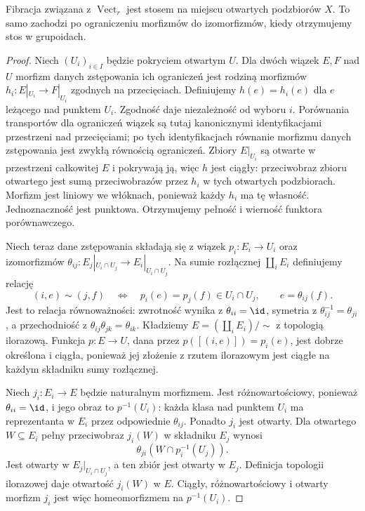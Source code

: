 \begin{twierdzenie}\label{cat:thm:vector-bundle-stack}
Fibracja związana z $\operatorname{Vect}_r$ jest stosem na miejscu otwartych podzbiorów $X$. To samo zachodzi po ograniczeniu morfizmów do izomorfizmów, kiedy otrzymujemy stos w grupoidach.
\end{twierdzenie}
\begin{proof}
Niech $(U_i)_{i\in I}$ będzie pokryciem otwartym $U$. Dla dwóch wiązek $E,F$ nad $U$ morfizm danych zstępowania ich ograniczeń jest rodziną morfizmów $h_i:E|_{U_i}\to F|_{U_i}$ zgodnych na przecięciach. Definiujemy $h(e)=h_i(e)$ dla $e$ leżącego nad punktem $U_i$. Zgodność daje niezależność od wyboru $i$. Porównania transportów dla ograniczeń wiązek są tutaj kanonicznymi identyfikacjami przestrzeni nad przecięciami; po tych identyfikacjach równanie morfizmu danych zstępowania jest zwykłą równością ograniczeń. Zbiory $E|_{U_i}$ są otwarte w przestrzeni całkowitej $E$ i pokrywają ją, więc $h$ jest ciągły: przeciwobraz zbioru otwartego jest sumą przeciwobrazów przez $h_i$ w tych otwartych podzbiorach. Morfizm jest liniowy we włóknach, ponieważ każdy $h_i$ ma tę własność. Jednoznaczność jest punktowa. Otrzymujemy pełność i wierność funktora porównawczego.

Niech teraz dane zstępowania składają się z wiązek $p_i:E_i\to U_i$ oraz izomorfizmów $\theta_{ij}:E_j|_{U_i\cap U_j}\to E_i|_{U_i\cap U_j}$. Na sumie rozłącznej $\coprod_i E_i$ definiujemy relację
\[
 (i,e)\sim(j,f)\quad\Longleftrightarrow\quad
 p_i(e)=p_j(f)\in U_i\cap U_j,\qquad
 e=\theta_{ij}(f).
\]
Jest to relacja równoważności: zwrotność wynika z $\theta_{ii}=\id$, symetria z $\theta_{ij}^{-1}=\theta_{ji}$, a przechodniość z $\theta_{ij}\theta_{jk}=\theta_{ik}$. Kładziemy $E=(\coprod_iE_i)/{\sim}$ z topologią ilorazową. Funkcja $p:E\to U$, dana przez $p([(i,e)])=p_i(e)$, jest dobrze określona i ciągła, ponieważ jej złożenie z rzutem ilorazowym jest ciągłe na każdym składniku sumy rozłącznej.

Niech $j_i:E_i\to E$ będzie naturalnym morfizmem. Jest różnowartościowy, ponieważ $\theta_{ii}=\id$, i jego obraz to $p^{-1}(U_i)$: każda klasa nad punktem $U_i$ ma reprezentanta w $E_i$ przez odpowiednie $\theta_{ij}$. Ponadto $j_i$ jest otwarty. Dla otwartego $W\subseteq E_i$ pełny przeciwobraz $j_i(W)$ w składniku $E_j$ wynosi
\[
 \theta_{ji}(W\cap p_i^{-1}(U_j)).
\]
Jest otwarty w $E_j|_{U_i\cap U_j}$, a ten zbiór jest otwarty w $E_j$. Definicja topologii ilorazowej daje otwartość $j_i(W)$ w $E$. Ciągły, różnowartościowy i otwarty morfizm $j_i$ jest więc homeomorfizmem na $p^{-1}(U_i)$.


\end{proof}

